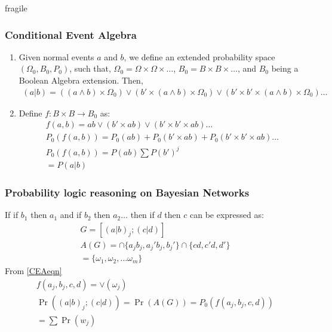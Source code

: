 \documentclass{beamer}
\providecommand{\pr}[1]{\ensuremath{\Pr\left(#1\right)}}
\begin{document}
\begin{frame}{fragile}
\frametitle{Conditional Event Algebra}

\begin{flushleft}
    \begin{enumerate}
        \item Given normal events $a$ and $b$, we define an extended probability space $(\Omega_0 , B_ 0 , P_0)$, such that, $\Omega_ 0 = \Omega \times \Omega \times \ldots$, $B_ 0 = B \times B \times \ldots$, and $B_0$ being a Boolean Algebra extension. Then,
        {\small
        \begin{align}
            (a|b) = ((a\wedge b)\times \Omega_0) \vee (b'\times (a\wedge b)\times \Omega_0) \vee (b'\times b'\times (a\wedge b)\times \Omega_0) \ldots
        \end{align}
        }
        \item Define $f: B \times B \rightarrow B_0$ as:
        \begin{align}
            f(a,b) = ab \vee (b'\times ab) \vee (b'\times b'\times ab) \ldots\\
            \label{CEAeqn}
            P_0(f(a,b)) = P_0(ab)  + P_0(b'\times ab) + P_0(b'\times b'\times ab) \ldots\\
            P_0(f(a,b)) = P(ab) \sum P(b')^j\\
            = P(a|b)
        \end{align}
    \end{enumerate}
\end{flushleft}
    
\end{frame}

\begin{frame}
    \frametitle{Probability logic reasoning on Bayesian Networks}
    \begin{flushleft}
       If if $b_1$ then $a_1$ and if $b_2$ then $a_2 \ldots$ then if $d$ then $c$ can be expressed as:
        \begin{align}
            G = [(a|b)_j;(c|d)]\\
            A(G) = \cap \{a_j b_j ,  a_j' b_j, b_j' \} \cap \{cd,c'd,d'\} \\
            = \{\omega_1 , \omega_2 ,\ldots \omega_{m}\}
        \end{align}
        From \eqref{CEAeqn}
        \begin{align}
            f(a_j,b_j,c,d) = \vee (\omega_j)\\
            \pr{(a|b)_j;(c|d)} = \pr{A(G)} 
            = P_0(f(a_j,b_j,c,d)) \\
            = \sum \pr{w_j}
        \end{align}
  \end{flushleft}
\end{frame}
\end{document}
